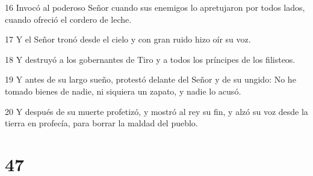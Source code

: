 \par 16 Invocó al poderoso Señor cuando sus enemigos lo apretujaron por todos lados, cuando ofreció el cordero de leche.
\par 17 Y el Señor tronó desde el cielo y con gran ruido hizo oír su voz.
\par 18 Y destruyó a los gobernantes de Tiro y a todos los príncipes de los filisteos.
\par 19 Y antes de su largo sueño, protestó delante del Señor y de su ungido: No he tomado bienes de nadie, ni siquiera un zapato, y nadie lo acusó.
\par 20 Y después de su muerte profetizó, y mostró al rey su fin, y alzó su voz desde la tierra en profecía, para borrar la maldad del pueblo.

\chapter{47}

